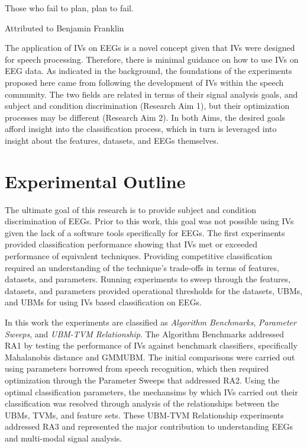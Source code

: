 
\begin{center}
Those who fail to plan, plan to fail.
\par Attributed to Benjamin Franklin
\end{center}

The application of \acp{IV} on \acp{EEG} is a novel concept given that \acp{IV} were designed for speech processing. Therefore, there is minimal guidance on how to use \acp{IV} on \ac{EEG} data. As indicated in the background, the foundations of the experiments proposed here came from following the development of \acp{IV} within the speech community. The two fields are related in terms of their signal analysis goals, and subject and condition discrimination (Research Aim 1), but their optimization processes may be different (Research Aim 2). In both Aims, the desired goals afford insight into the classification process, which in turn is leveraged into insight about the features, datasets, and \acp{EEG} themselves.

\section{Experimental Outline}

The ultimate goal of this research is to provide subject and condition discrimination of \acp{EEG}. Prior to this work, this goal was not possible using \acp{IV} given the lack of a software tools specifically for \acp{EEG}. The first experiments provided classification performance showing that \acp{IV} met or exceeded performance of equivalent techniques. Providing competitive classification required an understanding of the technique's trade-offs in terms of features, datasets, and parameters. Running experiments to sweep through the features, datasets, and parameters provided operational thresholds for the datasets, \acp{UBM}, and \acp{UBM} for using \acp{IV} based classification on \acp{EEG}.

In this work the experiments are classified as \emph{Algorithm Benchmarks}, \emph{Parameter Sweeps}, and \emph{\ac{UBM}-\ac{TVM} Relationship}. The Algorithm Benchmarks addressed \ac{RA1} by testing the performance of \acp{IV} against benchmark classifiers, specifically Mahalanobis distance and \ac{GMMUBM}. The initial comparisons were carried out using parameters borrowed from speech recognition, which then required optimization through the Parameter Sweeps that addressed \ac{RA2}. Using the optimal classification parameters, the mechansims by which \acp{IV} carried out their classification was resolved through analysis of the relationships between the \acp{UBM}, \acp{TVM}, and feature sets. These \ac{UBM}-\ac{TVM} Relationship experiments addressed \ac{RA3} and represented the major contribution to understanding \acp{EEG} and multi-modal signal analysis.

